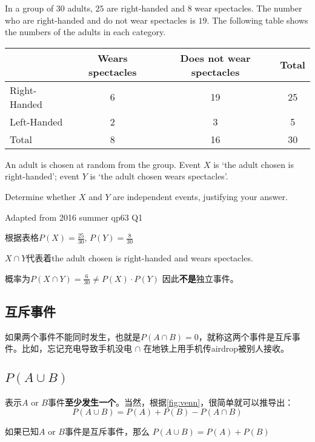 \begin{ExampleBox}
In a group of $30$ adults, $25$ are right-handed and $8$ wear spectacles. The number who are right-handed and do not wear spectacles is $19$. The following table shows the numbers of the adults in each category.
\begin{table}[H]
\centering
\begin{tabular}{|l|c|c|c|}
\hline
             & Wears spectacles & Does not wear spectacles & Total \\ \hline
Right-Handed & 6                & 19                       & 25    \\ \hline
Left-Handed  & 2                & 3                        & 5     \\ \hline
Total        & 8                & 16                       & 30    \\ \hline
\end{tabular}
\end{table}

An adult is chosen at random from the group. Event $X$ is ‘the adult chosen is right-handed’; event $Y$ is ‘the adult chosen wears spectacles’.

Determine whether $X$ and $Y$ are independent events, justifying your answer.


\makebox{}\hfill Adapted from 2016 summer qp63 Q1

\tcblower
根据表格$P(X) = \frac{25}{30}$, $P(Y) = \frac{8}{30}$

$X\cap Y$代表着the adult chosen is right-handed and wears spectacles.

概率为$P(X\cap Y) = \frac{6}{30}\neq P(X) \cdot P(Y)$
因此\textbf{不是}独立事件。
\end{ExampleBox}

\subsection*{互斥事件}
如果两个事件不能同时发生，也就是$P(A\cap B)=0$，就称这两个事件是互斥事件。比如，忘记充电导致手机没电 $\cap$ 在地铁上用手机传airdrop被别人接收。

\subsection*{$P(A\cup B)$}
表示$A$ or $B$事件\textbf{至少发生一个}。当然，根据\ref{fig:venn}，很简单就可以推导出：
\[
	P(A\cup B) = P(A)+P(B)-P(A \cap B)
\]

如果已知$A$ or $B$事件是互斥事件，那么 $P(A\cup B) = P(A)+P(B)$
\clearpage


